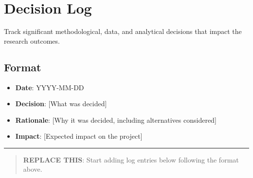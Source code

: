\documentclass[
]{report}
\author{}
\date{}
\providecommand{\tightlist}{%
  \setlength{\itemsep}{0pt}\setlength{\parskip}{0pt}}
\renewcommand*\contentsname{Table of contents}
\newcommand\contentsname{Table of contents}
\begin{document}
\renewcommand*\contentsname{Table of contents}
{
\hypersetup{linkcolor=}
\setcounter{tocdepth}{2}
\tableofcontents
}

\chapter{Decision Log}\label{decision-log}

Track significant methodological, data, and analytical decisions that
impact the research outcomes.

\section{Format}\label{format}

\begin{itemize}
\tightlist
\item
  \textbf{Date}: YYYY-MM-DD
\item
  \textbf{Decision}: {[}What was decided{]}
\item
  \textbf{Rationale}: {[}Why it was decided, including alternatives
  considered{]}
\item
  \textbf{Impact}: {[}Expected impact on the project{]}
\end{itemize}

\begin{center}\rule{0.5\linewidth}{0.5pt}\end{center}

\begin{quote}
\textbf{REPLACE THIS}: Start adding log entries below following the
format above.
\end{quote}
\end{document}
